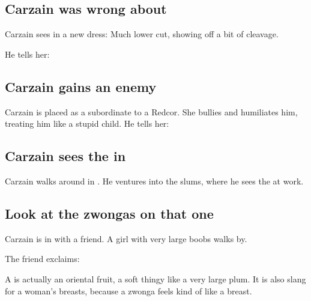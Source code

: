 \subsection{Carzain was wrong about \Esmerel}
Carzain sees \Esmerel{} in a new dress: Much lower cut, showing off a bit of cleavage. 

He tells her: 









\subsection{Carzain gains an enemy}
Carzain is placed as a subordinate to a Redcor. She bullies and humiliates him, treating him like a stupid child. He tells her:  









\subsection{Carzain sees the \Morbus{} in \Redce}
Carzain walks around in \Redce. He ventures into the slums, where he sees the  at work.







\subsection{Look at the zwongas on that one}
Carzain is in \Redce{} with a friend. 
A girl with very large boobs walks by. 

The friend exclaims: 

A  is actually an oriental fruit, a soft thingy like a very large plum. 
It is also slang for a woman's breasts, because a zwonga feels kind of like a breast. 









